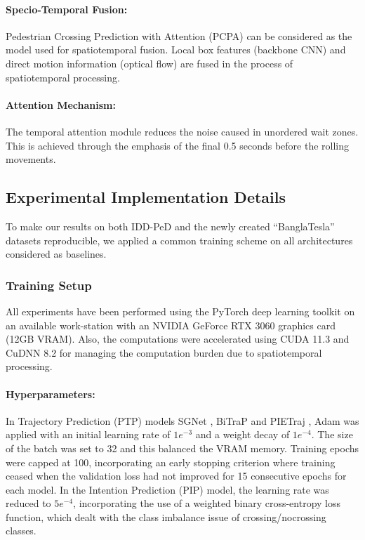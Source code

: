 \documentclass[12pt, a4paper]{article}
\begin{document}
\paragraph{Specio-Temporal Fusion:} Pedestrian Crossing Prediction with Attention (PCPA) \cite{rasouli2019pie} can be considered as the model used for spatiotemporal fusion. Local box features (backbone CNN) and direct motion information (optical flow) are fused in the process of spatiotemporal processing.

\paragraph{Attention Mechanism:} The temporal attention module reduces the noise caused in unordered wait zones. This is achieved through the emphasis of the final 0.5 seconds before the rolling movements.

\subsection{Experimental Implementation Details}
To make our results on both IDD-PeD and the newly created ``BanglaTesla'' datasets reproducible, we applied a common training scheme on all architectures considered as baselines.

\subsubsection{Training Setup}

All experiments have been performed using the PyTorch deep learning toolkit on an available work-station with an NVIDIA GeForce RTX 3060 graphics card (12GB VRAM). Also, the computations were accelerated using CUDA 11.3 and CuDNN 8.2 for managing the computation burden due to spatiotemporal processing.

\paragraph{Hyperparameters:}  In Trajectory Prediction (PTP) models SGNet \cite{wang2022stepwise}, BiTraP \cite{yao2021bitrap} and PIETraj \cite{rasouli2019pie}, Adam was applied with an initial learning rate of $1e^{-3}$ and a weight decay of $1e^{-4}$. The size of the batch was set to 32 and this balanced the VRAM memory. Training epochs were capped at 100, incorporating an early stopping criterion where training ceased when the validation loss had not improved for 15 consecutive epochs for each model. In the Intention Prediction (PIP) model, the learning rate was reduced to $5e^{-4}$, incorporating the use of a weighted binary cross-entropy loss function, which dealt with the class imbalance issue of crossing/nocrossing classes.
\end{document}
